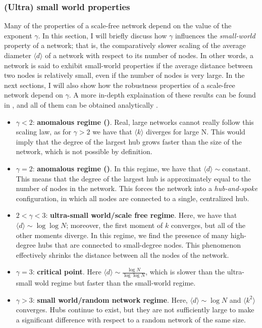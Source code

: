 \subsubsection{(Ultra) small world properties}
\label{subsec:gammas}
Many of the properties of a scale-free network depend on the value of the exponent $\gamma$.
In this section, I will briefly discuss how $\gamma$ influences the \emph{small-world} property of a network; that is, the comparatively slower scaling of the average diameter $\langle d \rangle$ of a network with respect to its number of nodes. In other words, a network is said to exhibit small-world properties if the average distance between two nodes is relatively small, even if the number of nodes is very large. In the next sections, I will also show how the robustness properties of a scale-free network depend on $\gamma$.
A more in-depth explaination of these results can be found in \cite{barabasi}, and all of them can be obtained analytically \cite{barabasi120, barabasi121}.

\begin{itemize}
    \item $\gamma < 2$: \textbf{anomalous regime ()}. Real, large networks cannot really follow this scaling law, as for $\gamma > 2$ we have that $\langle k \rangle$ diverges for large N. This would imply that the degree of the largest hub grows faster than the size of the network, which is not possible by definition.
    
    \item $\gamma = 2$: \textbf{anomalous regime ()}. In this regime, we have that $\langle d \rangle \sim \text{constant}$. This means that the degree of the largest hub is approximately equal to the number of nodes in the network. This forces the network into a \emph{hub-and-spoke} configuration, in which all nodes are connected to a single, centralized hub.

    \item $2 < \gamma < 3$: \textbf{ultra-small world/scale free regime}. Here, we have that $\langle 
    d \rangle \sim \log{}\log N$; moreover, the first moment of $k$ converges, but all of the other moments diverge. In this regime, we find the presence of many high-degree hubs that are connected to small-degree nodes. This phenomenon effectively shrinks the distance between all the nodes of the network.

    \item $\gamma = 3$: \textbf{critical point}. Here $\langle d \rangle \sim \frac{\log N}{\log{} \log N}$, which is slower than the ultra-small wold regime but faster than the small-world regime.

    \item $\gamma > 3$: \textbf{small world/random network regime}. Here, $\langle d \rangle \sim \log N$ and $\langle k^2 \rangle$ converges. Hubs continue to exist, but they are not sufficiently large to make a significant difference with respect to a random network of the same size.
\end{itemize}

